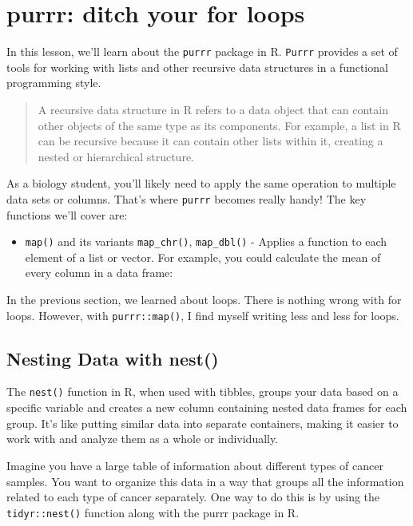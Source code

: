 \documentclass[
]{book}
\providecommand{\tightlist}{%
  \setlength{\itemsep}{0pt}\setlength{\parskip}{0pt}}
\begin{document}
\hypertarget{purrr-ditch-your-for-loops}{%
\section{purrr: ditch your for loops}\label{purrr-ditch-your-for-loops}}

In this lesson, we'll learn about the \texttt{purrr} package in R. \texttt{Purrr} provides a set of tools for working with lists and other recursive data structures in a functional programming style.

\begin{quote}
A recursive data structure in R refers to a data object that can contain other objects of the same type as its components. For example, a list in R can be recursive because it can contain other lists within it, creating a nested or hierarchical structure.
\end{quote}

As a biology student, you'll likely need to apply the same operation to multiple data sets or columns. That's where \texttt{purrr} becomes really handy! The key functions we'll cover are:

\begin{itemize}
\tightlist
\item
  \texttt{map()} and its variants \texttt{map\_chr()}, \texttt{map\_dbl()} - Applies a function to each element of a list or vector. For example, you could calculate the mean of every column in a data frame:
\end{itemize}

In the previous section, we learned about loops. There is nothing wrong with for loops. However, with \texttt{purrr::map()}, I find myself writing less and less for loops.

\hypertarget{nesting-data-with-nest}{%
\subsection{Nesting Data with nest()}\label{nesting-data-with-nest}}

The \texttt{nest()} function in R, when used with tibbles, groups your data based on a specific variable and creates a new column containing nested data frames for each group. It's like putting similar data into separate containers, making it easier to work with and analyze them as a whole or individually.

Imagine you have a large table of information about different types of cancer samples. You want to organize this data in a way that groups all the information related to each type of cancer separately. One way to do this is by using the \texttt{tidyr::nest()} function along with the purrr package in R.
\end{document}
